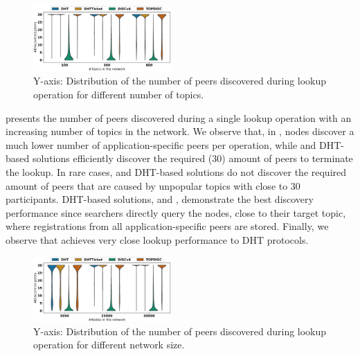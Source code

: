 \begin{figure}[!h]
\includegraphics[width=0.470\textwidth]{results/no_split/violin_topic_discovered.eps}
\vspace{-0.05in}
\caption{Y-axis: Distribution of the number of peers discovered during lookup operation for different number of topics.}
\label{fig:discoveredPerTopic}
\end{figure}

 presents the number of peers discovered during a single lookup operation with an increasing number of topics in the network. We observe that, in \discv, nodes discover a much lower number of application-specific peers per operation, while \sysname and DHT-based solutions efficiently discover the required (30) amount of peers to terminate the lookup. In rare cases, \sysname and DHT-based solutions do not discover the required amount of peers that are caused by unpopular topics with close to 30 participants. 
DHT-based solutions, \altname and \altnameticket, demonstrate the best discovery performance since searchers directly query the nodes, close to their target topic, where registrations from all application-specific peers are stored. Finally, we observe that \sysname achieves very close lookup performance to DHT protocols. 


\begin{figure}[!h]
\includegraphics[width=0.470\textwidth]{results/no_split/violin_size_discovered.eps}
\caption{Y-axis: Distribution of the number of peers discovered during lookup operation for different network size.}
\label{fig:discoveredPerSize}
\end{figure}

